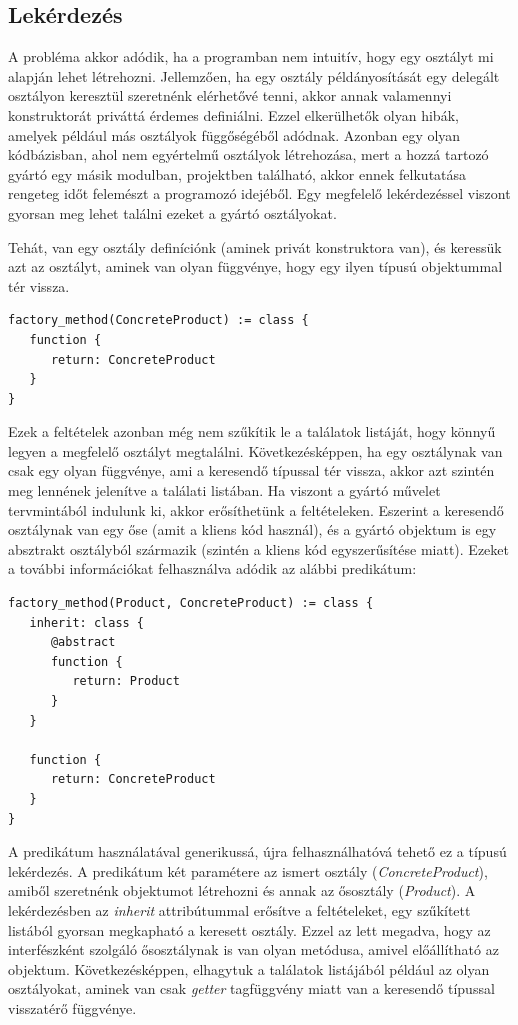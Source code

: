 \documentclass[a4paper,12pt]{report}
\begin{document}
\subsection{Lekérdezés}
A probléma akkor adódik, ha a programban nem intuitív, hogy egy osztályt mi alapján lehet létrehozni. Jellemzően, ha egy osztály példányosítását egy delegált osztályon keresztül szeretnénk elérhetővé tenni, akkor annak valamennyi konstruktorát priváttá érdemes definiálni. Ezzel elkerülhetők olyan hibák, amelyek például más osztályok függőségéből adódnak. Azonban egy olyan kódbázisban, ahol nem egyértelmű osztályok létrehozása, mert a hozzá tartozó gyártó egy másik modulban, projektben található, akkor ennek felkutatása rengeteg időt felemészt a programozó idejéből. Egy megfelelő lekérdezéssel viszont gyorsan meg lehet találni ezeket a gyártó osztályokat.
\par  Tehát, van egy osztály definíciónk (aminek privát konstruktora van), és keressük azt az osztályt, aminek van olyan függvénye, hogy egy ilyen típusú objektummal tér vissza. 
\begin{verbatim}
factory_method(ConcreteProduct) := class {
   function {
      return: ConcreteProduct
   }
}
\end{verbatim}
\par Ezek a feltételek azonban még nem szűkítik le a találatok listáját, hogy könnyű legyen a megfelelő osztályt megtalálni. Következésképpen, ha egy osztálynak van csak egy olyan függvénye, ami a keresendő típussal tér vissza, akkor azt szintén meg lennének jelenítve a találati listában. Ha viszont a gyártó művelet tervmintából indulunk ki, akkor erősíthetünk a feltételeken. Eszerint a keresendő osztálynak van egy őse (amit a kliens kód használ), és a gyártó objektum is egy absztrakt osztályból származik (szintén a kliens kód egyszerűsítése miatt). Ezeket a további információkat felhasználva adódik az alábbi predikátum:
\begin{verbatim}
factory_method(Product, ConcreteProduct) := class {
   inherit: class {
      @abstract
      function { 
         return: Product 
      }
   }

   function {
      return: ConcreteProduct
   }
}
\end{verbatim}
\par A predikátum használatával generikussá, újra felhasználhatóvá tehető ez a típusú lekérdezés. A predikátum két paramétere az ismert osztály (\textit{ConcreteProduct}), amiből szeretnénk objektumot létrehozni és annak az ősosztály (\textit{Product}). A lekérdezésben az \textit{inherit} attribútummal erősítve a feltételeket, egy szűkített listából gyorsan megkapható a keresett osztály. Ezzel az lett megadva, hogy az interfészként szolgáló ősosztálynak is van olyan metódusa, amivel előállítható az objektum. Következésképpen, elhagytuk a találatok listájából például az olyan osztályokat, aminek van csak \textit{getter} tagfüggvény miatt van a keresendő típussal visszatérő függvénye.
\end{document}

